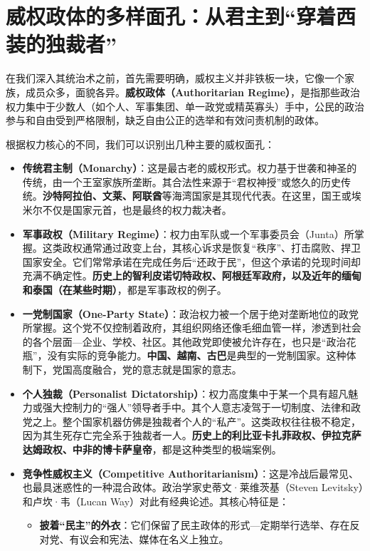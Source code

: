 \section{威权政体的多样面孔：从君主到“穿着西装的独裁者”}

在我们深入其统治术之前，首先需要明确，威权主义并非铁板一块，它像一个家族，成员众多，面貌各异。\textbf{威权政体（Authoritarian Regime）}，是指那些政治权力集中于少数人（如个人、军事集团、单一政党或精英寡头）手中，公民的政治参与和自由受到严格限制，缺乏自由公正的选举和有效问责机制的政体。

根据权力核心的不同，我们可以识别出几种主要的威权面孔：
\begin{itemize}
    \item \textbf{传统君主制（Monarchy）}：这是最古老的威权形式。权力基于世袭和神圣的传统，由一个王室家族所垄断。其合法性来源于“君权神授”或悠久的历史传统。\textbf{沙特阿拉伯、文莱、阿联酋}等海湾国家是其现代代表。在这里，国王或埃米尔不仅是国家元首，也是最终的权力裁决者。
    \item \textbf{军事政权（Military Regime）}：权力由军队或一个军事委员会（Junta）所掌握。这类政权通常通过政变上台，其核心诉求是恢复“秩序”、打击腐败、捍卫国家安全。它们常常承诺在完成任务后“还政于民”，但这个承诺的兑现时间却充满不确定性。\textbf{历史上的智利皮诺切特政权、阿根廷军政府，以及近年的缅甸和泰国（在某些时期）}，都是军事政权的例子。
    \item \textbf{一党制国家（One-Party State）}：政治权力被一个居于绝对垄断地位的政党所掌握。这个党不仅控制着政府，其组织网络还像毛细血管一样，渗透到社会的各个层面---企业、学校、社区。其他政党即使被允许存在，也只是“政治花瓶”，没有实际的竞争能力。\textbf{中国、越南、古巴}是典型的一党制国家。这种体制下，党国高度融合，党的意志就是国家的意志。
    \item \textbf{个人独裁（Personalist Dictatorship）}：权力高度集中于某一个具有超凡魅力或强大控制力的“强人”领导者手中。其个人意志凌驾于一切制度、法律和政党之上。整个国家机器仿佛是独裁者个人的“私产”。这类政权往往极不稳定，因为其生死存亡完全系于独裁者一人。\textbf{历史上的利比亚卡扎菲政权、伊拉克萨达姆政权、中非的博卡萨皇帝}，都是这种类型的极端案例。
    \item \textbf{竞争性威权主义（Competitive Authoritarianism）}：这是冷战后最常见、也最具迷惑性的一种混合政体。政治学家史蒂文·莱维茨基（Steven Levitsky）和卢坎·韦（Lucan Way）对此有经典论述。其核心特征是：
    \begin{itemize}
        \item \textbf{披着“民主”的外衣}：它们保留了民主政体的形式---定期举行选举、存在反对党、有议会和宪法、媒体在名义上独立。

\end{itemize}
\end{itemize}
